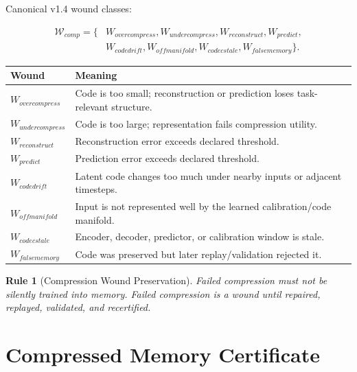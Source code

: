 \documentclass[12pt]{article}
\newtheorem{rulebox}{Rule}
\begin{document}
Canonical v1.4 wound classes:

\[
\begin{aligned}
\mathcal{W}_{comp}=\{&W_{overcompress},W_{undercompress},W_{reconstruct},W_{predict},\\
&W_{codedrift},W_{offmanifold},W_{codecstale},W_{falsememory}\}.
\end{aligned}
\]

\begin{longtable}{p{}p{}}
\toprule
\textbf{Wound} & \textbf{Meaning} \\
\midrule
\(W_{overcompress}\) & Code is too small; reconstruction or prediction loses task-relevant structure. \\
\(W_{undercompress}\) & Code is too large; representation fails compression utility. \\
\(W_{reconstruct}\) & Reconstruction error exceeds declared threshold. \\
\(W_{predict}\) & Prediction error exceeds declared threshold. \\
\(W_{codedrift}\) & Latent code changes too much under nearby inputs or adjacent timesteps. \\
\(W_{offmanifold}\) & Input is not represented well by the learned calibration/code manifold. \\
\(W_{codecstale}\) & Encoder, decoder, predictor, or calibration window is stale. \\
\(W_{falsememory}\) & Code was preserved but later replay/validation rejected it. \\
\bottomrule
\end{longtable}

\begin{rulebox}[Compression Wound Preservation]
Failed compression must not be silently trained into memory. Failed compression
is a wound until repaired, replayed, validated, and recertified.
\end{rulebox}

\section{Compressed Memory Certificate}
\end{document}
